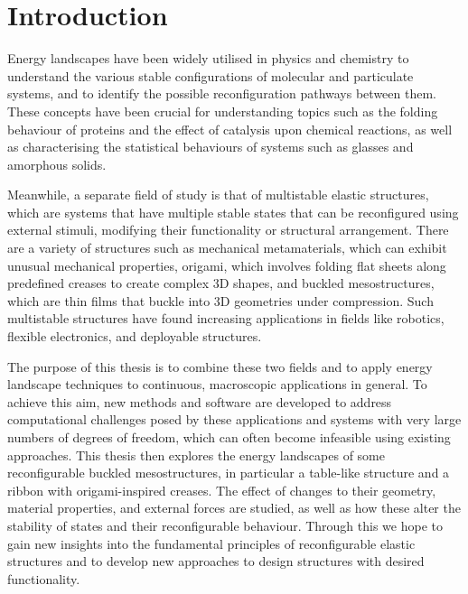 \chapter{Introduction}
\label{ch:introduction}

Energy landscapes have been widely utilised in physics and chemistry to understand the various stable configurations of molecular and particulate systems, and to identify the possible reconfiguration pathways between them.
These concepts have been crucial for understanding topics such as the folding behaviour of proteins\cite{Bryngelson1995} and the effect of catalysis upon chemical reactions\cite{Kerns2015}, as well as characterising the statistical behaviours of systems such as glasses and amorphous solids\cite{Raza2015}.

Meanwhile, a separate field of study is that of multistable elastic structures, which are systems that have multiple stable states that can be reconfigured using external stimuli, modifying their functionality or structural arrangement.
There are a variety of structures such as mechanical metamaterials\cite{Bertoldi2017a}, which can exhibit unusual mechanical properties, origami\cite{Peraza-Hernandez2014}, which involves folding flat sheets along predefined creases to create complex 3D shapes, and buckled mesostructures\cite{Fu2018}, which are thin films that buckle into 3D geometries under compression.
Such multistable structures have found increasing applications in fields like robotics\cite{Gorissen2020,Currier2020}, flexible electronics\cite{Fu2018,Hawkes2010}, and deployable structures\cite{Filipov2015,Zareei2020}.

The purpose of this thesis is to combine these two fields and to apply energy landscape techniques to continuous, macroscopic applications in general.
To achieve this aim, new methods and software are developed to address computational challenges posed by these applications and systems with very large numbers of degrees of freedom, which can often become infeasible using existing approaches.
This thesis then explores the energy landscapes of some reconfigurable buckled mesostructures, in particular a table-like structure and a ribbon with origami-inspired creases.
The effect of changes to their geometry, material properties, and external forces are studied, as well as how these alter the stability of states and their reconfigurable behaviour.
Through this we hope to gain new insights into the fundamental principles of reconfigurable elastic structures and to develop new approaches to design structures with desired functionality.

